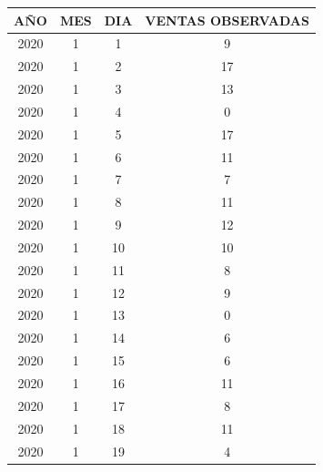 \begin{table}
\centering
\begin{tabular}{|c|c|c|c|} 
\hline
\textbf{AÑO} & \textbf{MES} & \textbf{DIA} & \textbf{VENTAS OBSERVADAS}  \\ 
\hline
2020         & 1            & 1            & 9                           \\ 
\hline
2020         & 1            & 2            & 17                          \\ 
\hline
2020         & 1            & 3            & 13                          \\ 
\hline
2020         & 1            & 4            & 0                           \\ 
\hline
2020         & 1            & 5            & 17                          \\ 
\hline
2020         & 1            & 6            & 11                          \\ 
\hline
2020         & 1            & 7            & 7                           \\ 
\hline
2020         & 1            & 8            & 11                          \\ 
\hline
2020         & 1            & 9            & 12                          \\ 
\hline
2020         & 1            & 10           & 10                          \\ 
\hline
2020         & 1            & 11           & 8                           \\ 
\hline
2020         & 1            & 12           & 9                           \\ 
\hline
2020         & 1            & 13           & 0                           \\ 
\hline
2020         & 1            & 14           & 6                           \\ 
\hline
2020         & 1            & 15           & 6                           \\ 
\hline
2020         & 1            & 16           & 11                          \\ 
\hline
2020         & 1            & 17           & 8                           \\ 
\hline
2020         & 1            & 18           & 11                          \\ 
\hline
2020         & 1            & 19           & 4                           \\ 

\end{tabular}
\end{table}
